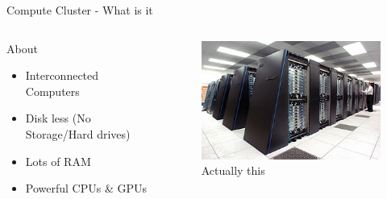 \begin{frame}{Compute Cluster - What is it}
\begin{columns}
    \begin{column}{0.47\textwidth}
    \begin{block}{About}
        \begin{itemize}
            \item Interconnected Computers
            \item Disk less (No Storage/Hard drives)
            \item Lots of RAM
            \item Powerful CPUs \& GPUs
        \end{itemize}
    \end{block}
    \end{column}
    \begin{column}{0.47\textwidth}
        \begin{figure}
        \centering
        \includegraphics[width=\textwidth]{img/hpc.jpg}
        \caption{Actually this}
        \label{fig:my_label}
    \end{figure}
    \end{column}
\end{columns}
\end{frame}

